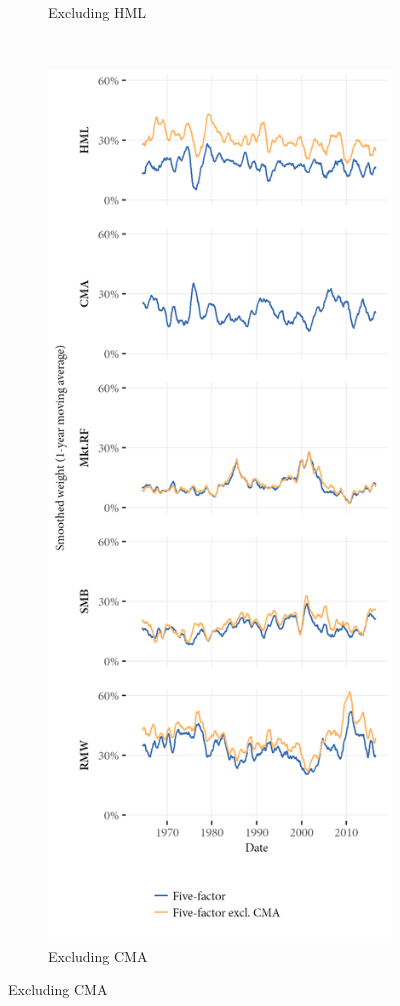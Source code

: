 \begin{figure}[htbp]
\begin{subfigure}{0.45\textwidth}
    \caption{Excluding HML}
  \end{subfigure}
  ~
  \begin{subfigure}{0.45\textwidth}
    \includegraphics[width=\textwidth]{graphics/weights/appendix_Weights_CDB_5F_EXCL_CMA_5F.png}
    \caption{Excluding CMA}
  \end{subfigure}
\end{figure}

